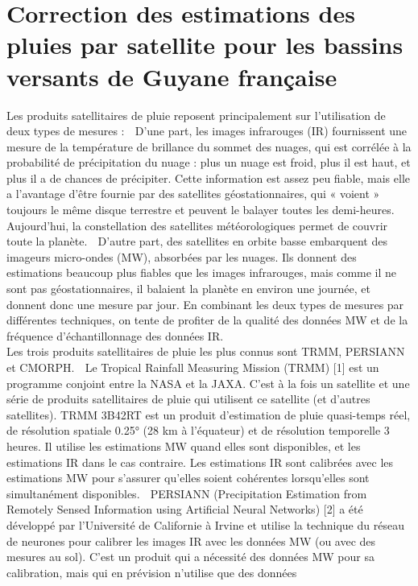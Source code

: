  \section{Correction des estimations des pluies par satellite pour les bassins versants de Guyane française}
 Les produits satellitaires de pluie reposent principalement sur l'utilisation de deux types de
mesures :
 D'une part, les images infrarouges (IR) fournissent une mesure de la température
de brillance du sommet des nuages, qui est corrélée à la probabilité de précipitation
du nuage : plus un nuage est froid, plus il est haut, et plus il a de chances de
précipiter. Cette information est assez peu fiable, mais elle a l'avantage d'être
fournie par des satellites géostationnaires, qui « voient » toujours le même disque
terrestre et peuvent le balayer toutes les demi-heures. Aujourd'hui, la constellation
des satellites météorologiques permet de couvrir toute la planète.
 D'autre part, des satellites en orbite basse embarquent des imageurs micro-ondes
(MW), absorbées par les nuages. Ils donnent des estimations beaucoup plus fiables
que les images infrarouges, mais comme il ne sont pas géostationnaires, il balaient
la planète en environ une journée, et donnent donc une mesure par jour.
En combinant les deux types de mesures par différentes techniques, on tente de profiter
de la qualité des données MW et de la fréquence d'échantillonnage des données IR.\\
Les trois produits satellitaires de pluie les plus connus sont TRMM, PERSIANN et
CMORPH.
 Le Tropical Rainfall Measuring Mission (TRMM) [1] est un programme conjoint entre
la NASA et la JAXA. C'est à la fois un satellite et une série de produits satellitaires
de pluie qui utilisent ce satellite (et d'autres satellites). TRMM 3B42RT est un
produit d'estimation de pluie quasi-temps réel, de résolution spatiale 0.25° (28 km à
l'équateur) et de résolution temporelle 3 heures. Il utilise les estimations MW quand
elles sont disponibles, et les estimations IR dans le cas contraire. Les estimations
IR sont calibrées avec les estimations MW pour s'assurer qu'elles soient
cohérentes lorsqu'elles sont simultanément disponibles.
 PERSIANN (Precipitation Estimation from Remotely Sensed Information using
Artificial Neural Networks) [2] a été développé par l'Université de Californie à Irvine
et utilise la technique du réseau de neurones pour calibrer les images IR avec les
données MW (ou avec des mesures au sol). C'est un produit qui a nécessité des
données MW pour sa calibration, mais qui en prévision n'utilise que des données
